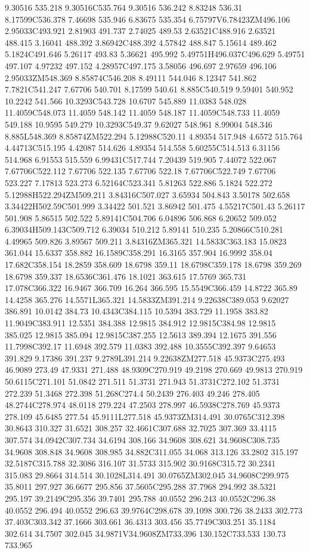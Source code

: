 9.30516 535.218 9.30516C535.764 9.30516 536.242 8.83248 536.31 8.17599C536.378 7.46698 535.946 6.83675 535.354 6.75797V6.78423ZM496.106 2.95033C493.921 2.81903 491.737 2.74025 489.53 2.63521C488.916 2.63521 488.415 3.16041 488.392 3.86942C488.392 4.57842 488.847 5.15614 489.462 5.1824C491.646 5.26117 493.83 5.36621 495.992 5.49751H496.037C496.629 5.49751 497.107 4.97232 497.152 4.28957C497.175 3.58056 496.697 2.97659 496.106 2.95033ZM548.369 8.85874C546.208 8.49111 544.046 8.12347 541.862 7.7821C541.247 7.67706 540.701 8.17599 540.61 8.885C540.519 9.59401 540.952 10.2242 541.566 10.3293C543.728 10.6707 545.889 11.0383 548.028 11.4059C548.073 11.4059 548.142 11.4059 548.187 11.4059C548.733 11.4059 549.188 10.9595 549.279 10.3293C549.37 9.62027 548.961 8.99004 548.346 8.885L548.369 8.85874ZM522.294 5.12988C520.11 4.89354 517.948 4.6572 515.764 4.44713C515.195 4.42087 514.626 4.89354 514.558 5.60255C514.513 6.31156 514.968 6.91553 515.559 6.99431C517.744 7.20439 519.905 7.44072 522.067 7.67706C522.112 7.67706 522.135 7.67706 522.18 7.67706C522.749 7.67706 523.227 7.17813 523.273 6.52164C523.341 5.81263 522.886 5.1824 522.272 5.12988H522.294ZM509.211 3.84316C507.027 3.65934 504.843 3.50178 502.658 3.34422H502.59C501.999 3.34422 501.521 3.86942 501.475 4.55217C501.43 5.26117 501.908 5.86515 502.522 5.89141C504.706 6.04896 506.868 6.20652 509.052 6.39034H509.143C509.712 6.39034 510.212 5.89141 510.235 5.20866C510.281 4.49965 509.826 3.89567 509.211 3.84316ZM365.321 14.5833C363.183 15.0823 361.044 15.6337 358.882 16.1589C358.291 16.3165 357.904 16.9992 358.04 17.682C358.154 18.2859 358.609 18.6798 359.11 18.6798C359.178 18.6798 359.269 18.6798 359.337 18.6536C361.476 18.1021 363.615 17.5769 365.731 17.078C366.322 16.9467 366.709 16.264 366.595 15.5549C366.459 14.8722 365.89 14.4258 365.276 14.5571L365.321 14.5833ZM391.214 9.22638C389.053 9.62027 386.891 10.0142 384.73 10.4343C384.115 10.5394 383.729 11.1958 383.82 11.9049C383.911 12.5351 384.388 12.9815 384.912 12.9815C384.98 12.9815 385.025 12.9815 385.094 12.9815C387.255 12.5613 389.394 12.1675 391.556 11.7998C392.17 11.6948 392.579 11.0383 392.488 10.3555C392.397 9.64653 391.829 9.17386 391.237 9.2789L391.214 9.22638ZM277.518 45.9373C275.493 46.9089 273.49 47.9331 271.488 48.9309C270.919 49.2198 270.669 49.9813 270.919 50.6115C271.101 51.0842 271.511 51.3731 271.943 51.3731C272.102 51.3731 272.239 51.3468 272.398 51.268C274.4 50.2439 276.403 49.246 278.405 48.2744C278.974 48.0118 279.224 47.2503 278.997 46.5938C278.769 45.9373 278.109 45.6485 277.54 45.9111L277.518 45.9373ZM314.491 30.0765C312.398 30.8643 310.327 31.6521 308.257 32.4661C307.688 32.7025 307.369 33.4115 307.574 34.0942C307.734 34.6194 308.166 34.9608 308.621 34.9608C308.735 34.9608 308.848 34.9608 308.985 34.882C311.055 34.068 313.126 33.2802 315.197 32.5187C315.788 32.3086 316.107 31.5733 315.902 30.9168C315.72 30.2341 315.083 29.8664 314.514 30.1028L314.491 30.0765ZM302.045 34.9608C299.975 35.8011 297.927 36.6677 295.856 37.5605C295.288 37.7968 294.992 38.5321 295.197 39.2149C295.356 39.7401 295.788 40.0552 296.243 40.0552C296.38 40.0552 296.494 40.0552 296.63 39.9764C298.678 39.1098 300.726 38.2433 302.773 37.403C303.342 37.1666 303.661 36.4313 303.456 35.7749C303.251 35.1184 302.614 34.7507 302.045 34.9871V34.9608ZM733.396 130.152C733.533 130.73 733.965 